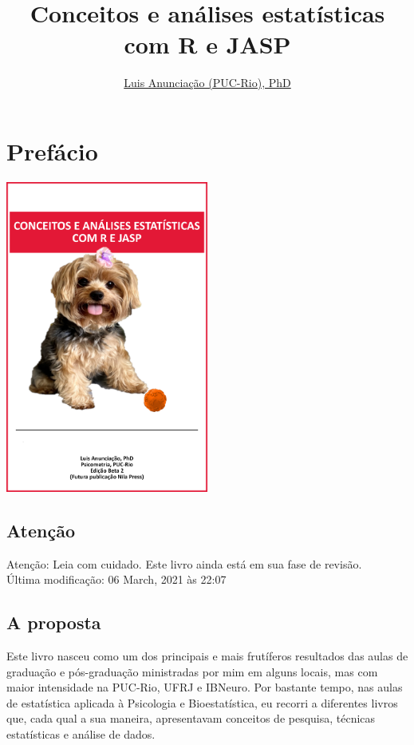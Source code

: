 \documentclass[
]{book}
\title{Conceitos e análises estatísticas com R e JASP}
\author{\href{mailto:\%20luisfca@puc-rio.br}{Luis Anunciação (PUC-Rio), PhD}}
\date{}
\begin{document}
\maketitle

{
\setcounter{tocdepth}{1}
\tableofcontents
}
\hypertarget{prefuxe1cio}{%
\chapter{Prefácio}\label{prefuxe1cio}}

\includegraphics[width=0.5\textwidth,height=\textheight]{./img/capa_jolie.png}

\hypertarget{atenuxe7uxe3o}{%
\section{Atenção}\label{atenuxe7uxe3o}}

Atenção: Leia com cuidado. Este livro ainda está em sua fase de revisão.\\
Última modificação: 06 March, 2021 às 22:07

\hypertarget{a-proposta}{%
\section{A proposta}\label{a-proposta}}

Este livro nasceu como um dos principais e mais frutíferos resultados das aulas de graduação e pós-graduação ministradas por mim em alguns locais, mas com maior intensidade na PUC-Rio, UFRJ e IBNeuro. Por bastante tempo, nas aulas de estatística aplicada à Psicologia e Bioestatística, eu recorri a diferentes livros que, cada qual a sua maneira, apresentavam conceitos de pesquisa, técnicas estatísticas e análise de dados.
\end{document}
